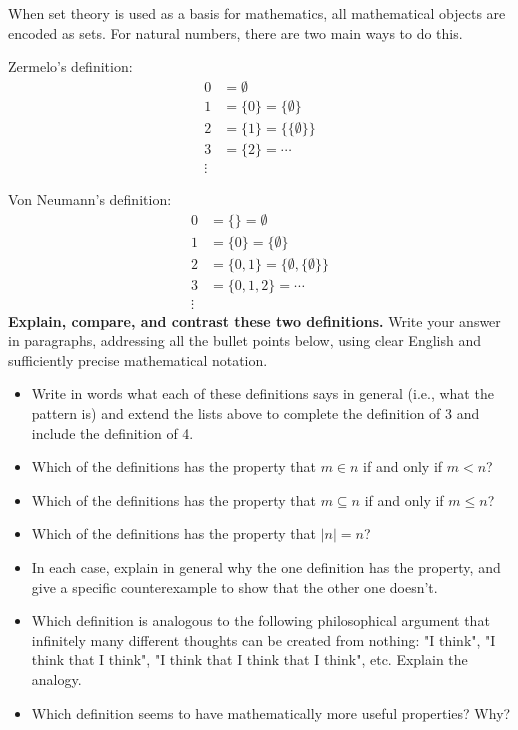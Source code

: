 \documentclass{article}
\begin{document}
When set theory is used as a basis for mathematics, all mathematical objects are encoded as sets.  For natural numbers, there are two main ways to do this.

Zermelo's definition:
\begin{align*}
    0 &= \emptyset\\
    1 &= \{0\} = \{\emptyset\}\\
    2 &= \{1\} = \{\{\emptyset\}\}\\
    3 & = \{2\} = \cdots\\
    \vdots
\end{align*}

Von Neumann's definition:
\begin{align*}
    0 &= \{\} = \emptyset\\
    1 &= \{0\} = \{\emptyset\}\\
    2 &= \{0,1\} = \{\emptyset,\{\emptyset\}\}\\
    3 & = \{0,1,2\} = \cdots\\
    \vdots
\end{align*}
\textbf{Explain, compare, and contrast these two definitions.}  Write your answer in paragraphs, addressing all the bullet points below, using clear English and sufficiently precise mathematical notation.
\begin{itemize}
    \item Write in words what each of these definitions says in general (i.e., what the pattern is) and extend the lists above to complete the definition of 3 and include the definition of 4.

    \item Which of the definitions has the property that $m \in n$ if and only if $m < n$?

    \item Which of the definitions has the property that $m \subseteq n$ if and only if $m \le n$?

    \item Which of the definitions has the property that $|n| = n$?

    \item In each case, explain in general why the one definition has the property, and give a specific counterexample to show that the other one doesn't.

    \item Which definition is analogous to the following philosophical argument that infinitely many different thoughts can be created from nothing: "I think", "I think that I think", "I think that I think that I think", etc.  Explain the analogy.

    \item Which definition seems to have mathematically more useful properties?  Why?
\end{itemize}
\end{document}
